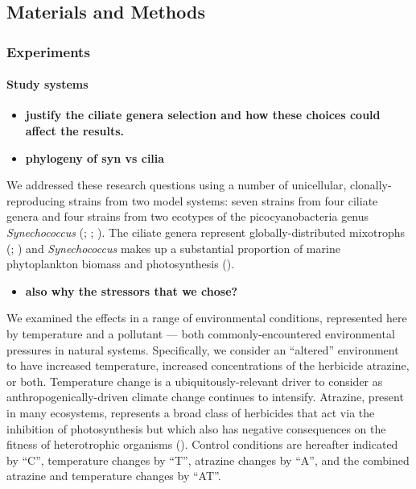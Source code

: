 \documentclass[
  letterpaper,
  DIV=11,
  numbers=noendperiod]{scrartcl}
\let\oldparagraph\paragraph
\renewcommand{\paragraph}[1]{\oldparagraph{#1}\mbox{}}
\providecommand{\tightlist}{%
  \setlength{\itemsep}{0pt}\setlength{\parskip}{0pt}}\usepackage{longtable,booktabs,array}
\begin{document}
\subsection{Materials and Methods}\label{sec-DAE_methods}

\subsubsection{Experiments}\label{experiments}

\paragraph{Study systems}\label{study-systems}

\begin{itemize}
\tightlist
\item
  \textbf{justify the ciliate genera selection and how these choices
  could affect the results.}
\item
  \textbf{phylogeny of syn vs cilia}
\end{itemize}

We addressed these research questions using a number of unicellular,
clonally-reproducing strains from two model systems: seven strains from
four ciliate genera and four strains from two ecotypes of the
picocyanobacteria genus \emph{Synechococcus}
(;
;
). The ciliate genera represent
globally-distributed mixotrophs (; ) and
\emph{Synechococcus} makes up a substantial proportion of marine
phytoplankton biomass and photosynthesis
().

\begin{itemize}
\tightlist
\item
  \textbf{also why the stressors that we chose?}
\end{itemize}

We examined the effects in a range of environmental conditions,
represented here by temperature and a pollutant --- both
commonly-encountered environmental pressures in natural systems.
Specifically, we consider an ``altered'' environment to have increased
temperature, increased concentrations of the herbicide atrazine, or
both. Temperature change is a ubiquitously-relevant driver to consider
as anthropogenically-driven climate change continues to intensify.
Atrazine, present in many ecosystems, represents a broad class of
herbicides that act via the inhibition of photosynthesis but which also
has negative consequences on the fitness of heterotrophic organisms
(). Control conditions are
hereafter indicated by ``C'', temperature changes by ``T'', atrazine
changes by ``A'', and the combined atrazine and temperature changes by
``AT''.
\end{document}
